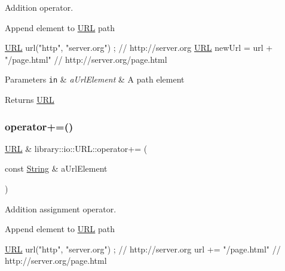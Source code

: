 Addition operator. 

Append element to \hyperlink{classlibrary_1_1io_1_1_u_r_l}{U\+RL} path


\begin{DoxyCode}
\hyperlink{classlibrary_1_1io_1_1_u_r_l_a7e9c070138a6dbd000ffb10b7cd8a5c4}{URL} url(\textcolor{stringliteral}{"http"}, \textcolor{stringliteral}{"server.org"}) ; \textcolor{comment}{// http://server.org}
\hyperlink{classlibrary_1_1io_1_1_u_r_l_a7e9c070138a6dbd000ffb10b7cd8a5c4}{URL} newUrl = url + \textcolor{stringliteral}{"/page.html"} \textcolor{comment}{// http://server.org/page.html}
\end{DoxyCode}



\begin{DoxyParams}[1]{Parameters}
\mbox{\tt in}  & {\em a\+Url\+Element} & A path element \\
\hline
\end{DoxyParams}
\begin{DoxyReturn}{Returns}
\hyperlink{classlibrary_1_1io_1_1_u_r_l}{U\+RL} 
\end{DoxyReturn}
\mbox{\label{classlibrary_1_1io_1_1_u_r_l_a03c4127e3d9e7e44b5d5f1dcd4db950c}} 
\subsubsection{\texorpdfstring{operator+=()}{operator+=()}}
{\footnotesize\ttfamily \hyperlink{classlibrary_1_1io_1_1_u_r_l}{U\+RL} \& library\+::io\+::\+U\+R\+L\+::operator+= (\begin{DoxyParamCaption}\item[{const \hyperlink{namespacelibrary_1_1io_a7469b45835a4421045db344d6a5a1f85}{String} \&}]{a\+Url\+Element }\end{DoxyParamCaption})}



Addition assignment operator. 

Append element to \hyperlink{classlibrary_1_1io_1_1_u_r_l}{U\+RL} path


\begin{DoxyCode}
\hyperlink{classlibrary_1_1io_1_1_u_r_l_a7e9c070138a6dbd000ffb10b7cd8a5c4}{URL} url(\textcolor{stringliteral}{"http"}, \textcolor{stringliteral}{"server.org"}) ; \textcolor{comment}{// http://server.org}
url += \textcolor{stringliteral}{"/page.html"} \textcolor{comment}{// http://server.org/page.html}
\end{DoxyCode}



